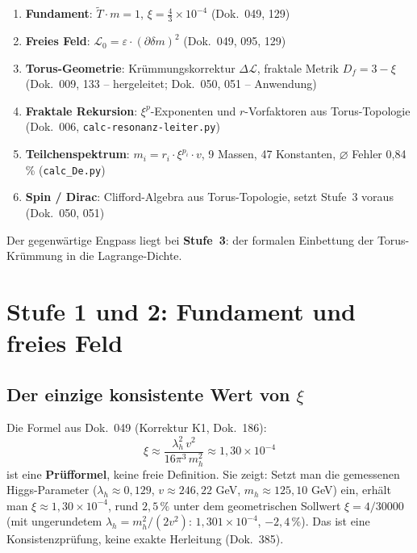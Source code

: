 \begin{enumerate}
    \item \textbf{Fundament}: $\tilde{T} \cdot m = 1$,
          $\xi = \frac{4}{3} \times 10^{-4}$ (Dok.~049, 129)
    \item \textbf{Freies Feld}: $\mathcal{L}_0 = \varepsilon \cdot
          (\partial\delta m)^2$ (Dok.~049, 095, 129)
    \item \textbf{Torus-Geometrie}: Krümmungskorrektur $\Delta\mathcal{L}$,
          fraktale Metrik $D_f = 3 - \xi$ (Dok.~009, 133 -- hergeleitet; Dok.~050, 051 -- Anwendung)
    \item \textbf{Fraktale Rekursion}: $\xi^p$-Exponenten und
          $r$-Vorfaktoren aus Torus-Topologie (Dok.~006,
          \texttt{calc-resonanz-leiter.py})
    \item \textbf{Teilchenspektrum}: $m_i = r_i \cdot \xi^{p_i} \cdot v$,
          9 Massen, 47 Konstanten, $\varnothing$ Fehler 0{,}84\,\%
          (\texttt{calc\_De.py})
    \item \textbf{Spin / Dirac}: Clifford-Algebra aus Torus-Topologie,
          setzt Stufe~3 voraus (Dok.~050, 051)
\end{enumerate}

Der gegenwärtige Engpass liegt bei \textbf{Stufe~3}: der formalen
Einbettung der Torus-Krümmung in die Lagrange-Dichte.

\section{Stufe 1 und 2: Fundament und freies Feld}

\subsection{Der einzige konsistente Wert von \texorpdfstring{$\xi$}{xi}}

Die Formel aus Dok.~049 (Korrektur K1, Dok.~186):
\begin{equation}
    \xi \approx \frac{\lambda_h^2\, v^2}{16\pi^3\, m_h^2}
    \approx 1{,}30 \times 10^{-4}
    \label{eq:xi_higgs}
\end{equation}
ist eine \textbf{Prüfformel}, keine freie Definition. Sie zeigt:
Setzt man die gemessenen Higgs-Parameter
($\lambda_h \approx 0{,}129$, $v \approx 246{,}22$ GeV,
$m_h \approx 125{,}10$ GeV) ein, erhält man $\xi \approx 1{,}30 \times 10^{-4}$,
rund $2{,}5\,\%$ unter dem geometrischen Sollwert $\xi = 4/30000$
(mit ungerundetem $\lambda_h = m_h^2/(2v^2)$: $1{,}301 \times 10^{-4}$, $-2{,}4\,\%$).
Das ist eine Konsistenzprüfung, keine exakte Herleitung (Dok.~385).

